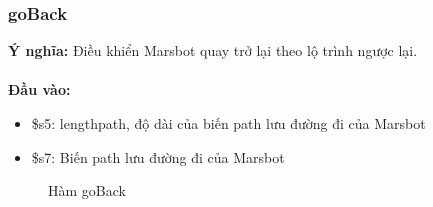 \documentclass[a4paper,12pt]{article}
\begin{document}
	\subsubsection{goBack}
	    \textbf{Ý nghĩa:} Điều khiển Marsbot quay trở lại theo lộ trình ngược lại.\\ \\
	    \textbf{Đầu vào:} 
	    \begin{itemize}
            \item \$s5: lengthpath, độ dài của biến path lưu đường đi của Marsbot
            \item \$s7: Biến path lưu đường đi của Marsbot
        \end{itemize}
	    \FloatBarrier
        \begin{figure}[ht!]
    	    \centerline{}
    	    \label{fig:bai100}
        \end{figure}
        \clearpage
        \begin{figure}[ht!]
    	    \centerline{}
    	    \caption{Hàm goBack}
    	    \label{fig:bai100}
        \end{figure}
\end{document}
